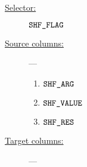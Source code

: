 \begin{description}
	\item[\underline{Selector:}] $\texttt{SHF\_FLAG}$
	\item[\underline{Source columns:}] ---
		\begin{multicols}{4}
			\begin{enumerate}
				\item $\texttt{SHF\_ARG}$
				\item $\texttt{SHF\_VALUE}$
				\item $\texttt{SHF\_RES}$
			\end{enumerate}
		\end{multicols}
	\item[\underline{Target columns:}] ---
		\begin{multicols}{4}
		\begin{enumerate}
		\end{enumerate}
		\end{multicols}
\end{description}